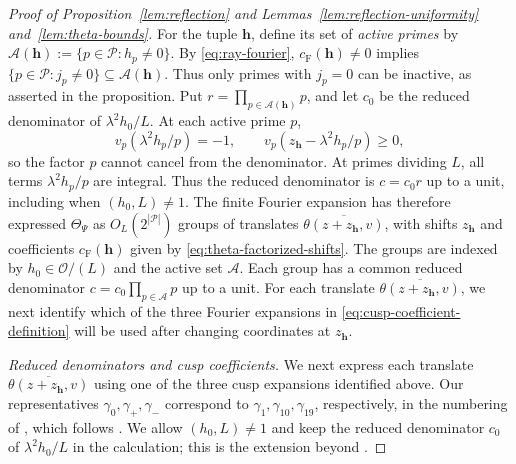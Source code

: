 \documentclass[11pt,a4paper]{article}
\numberwithin{equation}{section}
\numberwithin{figure}{section}
\theoremstyle{definition}
\theoremstyle{remark}
\newcommand{\OO}{\mathcal O}
\begin{document}
\begin{proof}[Proof of Proposition~\ref{lem:reflection} and Lemmas~\ref{lem:reflection-uniformity} and~\ref{lem:theta-bounds}]
For the tuple $\boldsymbol h$, define its set of \emph{active primes} by
$\mathcal A(\boldsymbol h):=\{p\in\mathcal P:h_p\ne0\}$.
By \eqref{eq:ray-fourier}, $c_{\mathrm F}(\boldsymbol h)\ne0$ implies
$\{p\in\mathcal P:j_p\ne0\}\subseteq\mathcal A(\boldsymbol h)$.
Thus only primes with $j_p=0$ can be inactive, as asserted in the proposition.
Put $r=\prod_{p\in\mathcal A(\boldsymbol h)}p$, and let $c_0$ be the reduced
denominator of $\lambda^2h_0/L$. At each active prime $p$,
\[
 v_p(\lambda^2h_p/p)=-1,
 \qquad v_p(z_{\boldsymbol h}-\lambda^2h_p/p)\ge0,
\]
so the factor $p$ cannot cancel from the denominator. At primes
dividing $L$, all terms $\lambda^2h_p/p$ are integral. Thus the reduced denominator is $c=c_0r$ up to a unit, including
when $(h_0,L)\ne1$. The finite Fourier expansion has therefore
expressed $\Theta_\Psi$ as $O_L(2^{|\mathcal P|})$ groups of
translates $\overline{\theta(z+z_{\boldsymbol h},v)}$, with shifts $z_{\boldsymbol h}$ and
coefficients $c_{\mathrm F}(\boldsymbol h)$ given by \eqref{eq:theta-factorized-shifts}.
The groups are indexed by $h_0\in\OO/(L)$ and the active set
$\mathcal A$. Each group has a common reduced denominator
$c=c_0\prod_{p\in\mathcal A}p$ up to a unit. For each translate
$\overline{\theta(z+z_{\boldsymbol h},v)}$, we next identify which of the three
Fourier expansions in \eqref{eq:cusp-coefficient-definition} will
be used after changing coordinates at $z_{\boldsymbol h}$.

\noindent\textit{Reduced denominators and cusp coefficients.}\quad
We next express each translate $\overline{\theta(z+z_{\boldsymbol h},v)}$
using one of the three cusp expansions identified above.
Our representatives $\gamma_0,\gamma_+,\gamma_-$ correspond to
$\gamma_1,\gamma_{10},\gamma_{19}$, respectively, in the numbering
of \cite[\S5.1]{DR}, which follows \cite[Table~II]{Pat77}.
We allow
$(h_0,L)\ne1$ and keep the reduced denominator $c_0$ of
$\lambda^2h_0/L$ in the calculation; this is the extension beyond
\cite[Corollary~5.1]{DR}.



\end{proof}
\end{document}
